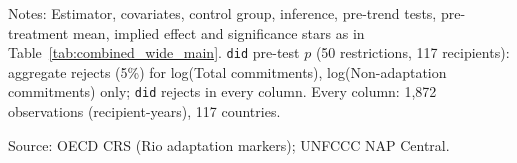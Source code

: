 \begin{table}[H]
\centering
\caption{Effect of NAP adoption on climate finance: simple ATT across outcomes (main specification, balanced panel, covariates at $g-1$)}
\label{tab:combined_wide_balanced}
\begingroup\small
{}
\endgroup
\par\vspace{4pt}
\begin{minipage}{\linewidth}\footnotesize
Notes: Estimator, covariates, control group, inference, pre-trend tests, pre-treatment mean, implied effect and significance stars as in Table~\ref{tab:combined_wide_main}. \texttt{did} pre-test $p$ (50 restrictions, 117 recipients): aggregate rejects (5\%) for log(Total commitments), log(Non-adaptation commitments) only; \texttt{did} rejects in every column. Every column: 1,872 observations (recipient-years), 117 countries.\par
Source: OECD CRS (Rio adaptation markers); UNFCCC NAP Central.
\end{minipage}
\end{table}
